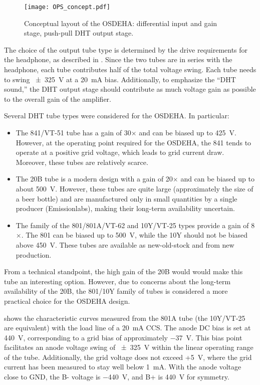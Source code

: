 \begin{figure}
\begin{center}
\texttt{[image: OPS\_concept.pdf]}
\caption{Conceptual layout of the OSDEHA: differential input and gain stage, push-pull DHT output stage.}
\end{center}
\end{figure}

The choice of the output tube type is determined by the drive requirements for the headphone, as described in . Since the two tubes are in series with the headphone, each tube contributes half of the total voltage swing. Each tube needs to swing \SI{\pm325}{V} at a \SI{20}{mA} bias. Additionally, to emphasize the ``DHT sound,'' the DHT output stage should contribute as much voltage gain as possible to the overall gain of the amplifier.

Several DHT tube types were considered for the OSDEHA\cite{osdeha_p9,osdeha_whichDHT}. In particular:

\begin{itemize}
\item The 841/VT-51 tube has a gain of 30$\times$ and can be biased up to \SI{425}{V}. However, at the operating point required for the OSDEHA, the 841 tends to operate at a positive grid voltage, which leads to grid current draw. Moreover, these tubes are relatively scarce.
\item The 20B tube is a modern design with a gain of 20$\times$ and can be biased up to about \SI{500}{V}. However, these tubes are quite large (approximately the size of a beer bottle) and are manufactured only in small quantities by a single producer (Emissionlabs), making their long-term availability uncertain.
\item The family of the 801/801A/VT-62 and 10Y/VT-25 types\cite{aasyl_801types} provide a gain of 8$\times$. The 801 can be biased up to \SI{500}{V}, while the 10Y should not be biased above \SI{450}{V}. These tubes are available as new-old-stock and from new production.
\end{itemize}

From a technical standpoint, the high gain of the 20B would would make this tube an interesting option. However, due to concerns about the long-term availability of the 20B, the 801/10Y family of tubes is considered a more practical choice for the OSDEHA design.

 shows the characteristic curves measured from the 801A tube (the 10Y/VT-25 are equivalent) with the load line of a \SI{20}{mA} CCS. The anode DC bias is set at \SI{440}{V}, corresponding to a grid bias of approximately \SI{-37}{V}. This bias point facilitates an anode voltage swing of \SI{\pm325}{V} within the linear operating range of the tube. Additionally, the grid voltage does not exceed +\SI{5}{V}, where the grid current has been measured to stay well below \SI{1}{mA}. With the anode voltage close to GND, the B- voltage is \SI{-440}{V}, and B+ is \SI{+440}{V} for symmetry.

